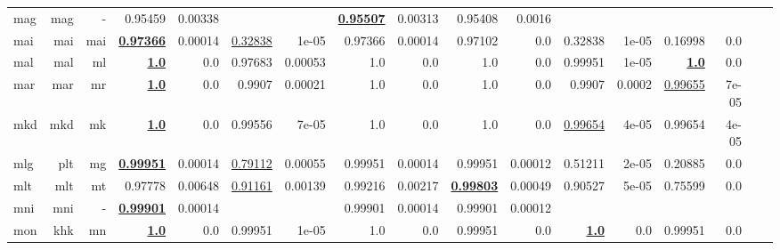 \documentclass[11pt]{article}
\begin{document}
\begin{table*}[h]
{\begin{tabular}{lrrrrrrrrrrrrrrrr}
mag         & mag         & -         & 0.95459         & 0.00338         &          &          & \textbf{\underline{0.95507}}         & 0.00313         & 0.95408         & 0.0016         &          &          &          &          \\
mai         & mai         & mai         & \textbf{\underline{0.97366}}         & 0.00014         & \underline{0.32838}         & 1e-05         & 0.97366         & 0.00014         & 0.97102         & 0.0         & 0.32838         & 1e-05         & 0.16998         & 0.0         \\
mal         & mal         & ml         & \textbf{\underline{1.0}}         & 0.0         & 0.97683         & 0.00053         & 1.0         & 0.0         & 1.0         & 0.0         & 0.99951         & 1e-05         & \textbf{\underline{1.0}}         & 0.0         \\
mar         & mar         & mr         & \textbf{\underline{1.0}}         & 0.0         & 0.9907         & 0.00021         & 1.0         & 0.0         & 1.0         & 0.0         & 0.9907         & 0.0002         & \underline{0.99655}         & 7e-05         \\
mkd         & mkd         & mk         & \textbf{\underline{1.0}}         & 0.0         & 0.99556         & 7e-05         & 1.0         & 0.0         & 1.0         & 0.0         & \underline{0.99654}         & 4e-05         & 0.99654         & 4e-05         \\
mlg         & plt         & mg         & \textbf{\underline{0.99951}}         & 0.00014         & \underline{0.79112}         & 0.00055         & 0.99951         & 0.00014         & 0.99951         & 0.00012         & 0.51211         & 2e-05         & 0.20885         & 0.0         \\
mlt         & mlt         & mt         & 0.97778         & 0.00648         & \underline{0.91161}         & 0.00139         & 0.99216         & 0.00217         & \textbf{\underline{0.99803}}         & 0.00049         & 0.90527         & 5e-05         & 0.75599         & 0.0         \\
mni         & mni         & -         & \textbf{\underline{0.99901}}         & 0.00014         &          &          & 0.99901         & 0.00014         & 0.99901         & 0.00012         &          &          &          &          \\
mon         & khk         & mn         & \textbf{\underline{1.0}}         & 0.0         & 0.99951         & 1e-05         & 1.0         & 0.0         & 0.99951         & 0.0         & \textbf{\underline{1.0}}         & 0.0         & 0.99951         & 0.0         \\

\end{tabular}}
\end{table*}
\end{document}

